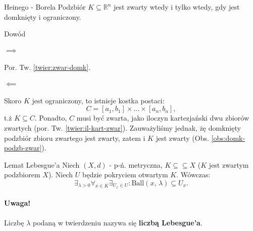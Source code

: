 \documentclass{article}
\numberwithin{defi}{section}
\numberwithin{defi}{section}
\newcommand{\R}{\mathbb{R}}
\newcommand{\se}{\subseteq}
\newcommand{\ball}[2]{\text{Ball}(#1, \, #2)}
\begin{document}
    
\begin{twier}{Heinego - Borela}
    Podzbiór $K \se \R ^n $ jest zwarty wtedy i tylko wtedy, gdy jest domknięty i ograniczony.
\end{twier}
\begin{dow}{Dowód}
    \paragraph{$\implies$} Por. Tw. \ref{twier:zwar-domk}.
    \paragraph{$\impliedby$} Skoro $K$ jest ograniczony, to istnieje kostka postaci:\begin{equation}
        C = [a_1, b_1] \times ... \times [a_n, b_n],
    \end{equation} t.ż $K \se C$. Ponadto, $C$ musi być zwarta, jako iloczyn kartezjański dwu zbiorów zwartych (por. Tw. \ref{twier:il-kart-zwar}). Zauważyliśmy jednak, żę domknięty podzbiór zbioru zwartego jest zwarty, zatem i $K$ jest zwarty (Obs. \ref{obs:domk-podzb-zwar}).
\end{dow}

\begin{twier}{Lemat Lebesgue'a}
    Niech $(X, d)$ - p-ń. metryczna, $K \se \se X$ ($K$ jest zwartym podzbiorem $X$). Niech $U$ będzie pokryciem otwartym $K$. Wówczas: \begin{equation}
        \exists_{\lambda > 0} \forall_{x \in K} \exists_{U_x \in U}: \ball{x}{\lambda} \subseteq U_x.
    \end{equation}
\end{twier}
    \paragraph{Uwaga!} Liczbę $\lambda$ podaną w twierdzeniu nazywa się \textbf{liczbą Lebesgue'a}.
\end{document}
